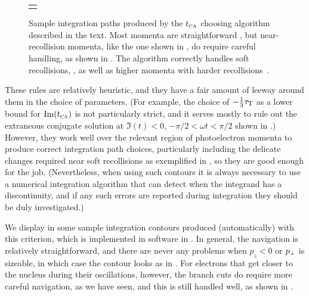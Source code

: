 \begin{figure}[t!]
\begin{tabular}{c}
{      \label{f5-path-chooser-examples-d}
    }
  \end{tabular}
  \captionsetup{width=\textwidth}
  \caption[
  Sample integration paths produced by the $\tca$ choosing algorithm 
  ]{
  Sample integration paths produced by the $\tca$ choosing algorithm described in the text. Most momenta are straightforward \protect{}, but near-recollision momenta, like the one shown in , do require careful handling, as shown in \protect{}. The algorithm correctly handles soft recollisions, \protect{}, as well as higher momenta with harder recollisions~\protect{}.
  }
  \label{f5-path-chooser-examples}
\end{figure}


\captionsetup[figure]{position=auto}



These rules are relatively heuristic, and they have a fair amount of leeway around them in the choice of parameters. (For example, the choice of $-\frac13 {\tau_\mathrm{T}}$ as a lower bound for $\Im({t_{\scriptscriptstyle\mathrm{CA}}})$ is not particularly strict, and it serves mostly to rule out the extraneous conjugate solution at $\Im(t)<0$, $-\pi/2<\omega t<\pi/2$ shown in .) However, they work well over the relevant region of photoelectron momenta to produce correct integration path choices, particularly including the delicate changes required near soft recollisions as exemplified in , so they are good enough for the job. (Nevertheless, when using such contours it is always necessary to use a numerical integration algorithm that can detect when the integrand has a discontinuity, and if any such errors are reported during integration they should be duly investigated.)





We display in  some sample integration contours produced (automatically) with this criterion, which is implemented in software in . In general, the navigation is relatively straightforward, and there are never any problems when $p_z<0$ or ${p_{\perp}}$ is sizeable, in which case the contour looks as in . For electrons that get closer to the nucleus during their oscillations, however, the branch cuts do require more careful navigation, as we have seen, and this is still handled well, as shown in .


